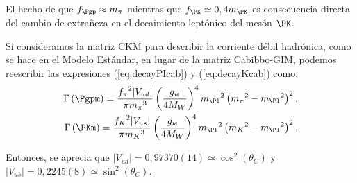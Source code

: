 El hecho de que $f_{\Pgp} \approx m_{\pi}$ mientras que $f_{\PK} \simeq 0,4m_{\PK}$  es consecuencia directa del cambio de extrañeza en el decaimiento leptónico del mesón $\PK$. 

Si consideramos la matriz CKM para describir la corriente débil hadrónica, como se hace en el Modelo Estándar, en lugar de la matriz Cabibbo-GIM, podemos reescribir las expresiones (\ref{eq:decayPIcab}) y (\ref{eq:decayKcab}) como:
\begin{align}
\Gamma\left(\Pgpm \right) =\dfrac{{f_{\pi}}^{2}|V_{ud}|}{\pi {m_{\pi}}^{3}}\left( \dfrac{g_w}{4M_W}\right)^{4} {m_{\Pl}}^{2}\left({m_{\pi}}^{2}-{m_{\Pl}}^{2}\right)^{2},\label{eq:decayPIckm}\\
\Gamma\left(\PKm \right) =\dfrac{{f_{K}}^{2}|V_{us}|}{\pi {m_{K}}^{3}}\left(\dfrac{g_w}{4M_W}\right)^{4} {m_{\Pl}}^{2}\left({m_{K}}^{2}-{m_{\Pl}}^{2}\right)^{2}.\label{eq:decayKckm}
\end{align}

Entonces, se aprecia que $|V_{ud}|= 0,97370(14) \simeq \cos^{2} \left(\theta_{C}\right)$ y $|V_{us}|= 0,2245(8) \simeq \sin^{2} \left(\theta_{C}\right)$\protect\footnotemark .

